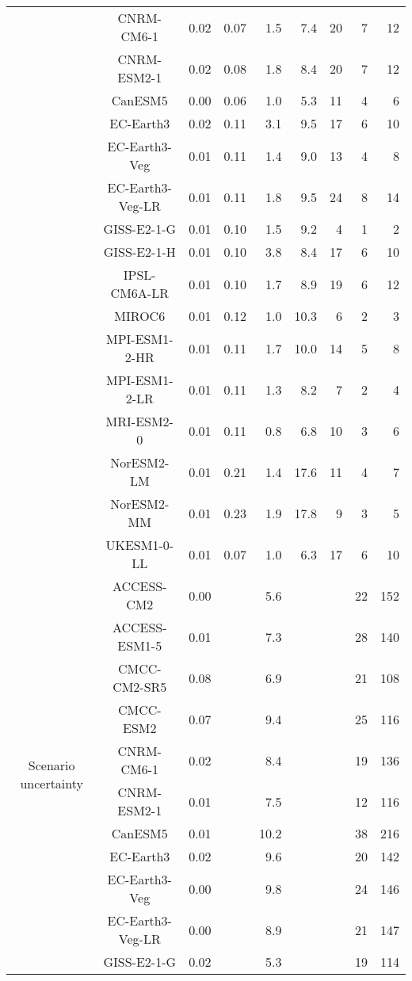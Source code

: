 \begin{table*}[t]
\begin{tabular}{c|c|rr|rr|rrr}
 & CNRM-CM6-1 & 0.02 & 0.07 & 1.5 & 7.4 & 20 & 7 & 12 \\
 & CNRM-ESM2-1 & 0.02 & 0.08 & 1.8 & 8.4 & 20 & 7 & 12 \\
 & CanESM5 & 0.00 & 0.06 & 1.0 & 5.3 & 11 & 4 & 6 \\
 & EC-Earth3 & 0.02 & 0.11 & 3.1 & 9.5 & 17 & 6 & 10 \\
 & EC-Earth3-Veg & 0.01 & 0.11 & 1.4 & 9.0 & 13 & 4 & 8 \\
 & EC-Earth3-Veg-LR & 0.01 & 0.11 & 1.8 & 9.5 & 24 & 8 & 14 \\
 & GISS-E2-1-G & 0.01 & 0.10 & 1.5 & 9.2 & 4 & 1 & 2 \\
 & GISS-E2-1-H & 0.01 & 0.10 & 3.8 & 8.4 & 17 & 6 & 10 \\
 & IPSL-CM6A-LR & 0.01 & 0.10 & 1.7 & 8.9 & 19 & 6 & 12 \\
 & MIROC6 & 0.01 & 0.12 & 1.0 & 10.3 & 6 & 2 & 3 \\
 & MPI-ESM1-2-HR & 0.01 & 0.11 & 1.7 & 10.0 & 14 & 5 & 8 \\
 & MPI-ESM1-2-LR & 0.01 & 0.11 & 1.3 & 8.2 & 7 & 2 & 4 \\
 & MRI-ESM2-0 & 0.01 & 0.11 & 0.8 & 6.8 & 10 & 3 & 6 \\
 & NorESM2-LM & 0.01 & 0.21 & 1.4 & 17.6 & 11 & 4 & 7 \\
 & NorESM2-MM & 0.01 & 0.23 & 1.9 & 17.8 & 9 & 3 & 5 \\
 & UKESM1-0-LL & 0.01 & 0.07 & 1.0 & 6.3 & 17 & 6 & 10 \\
\cline{1-9}
\multirow[c]{20}{*}{Scenario uncertainty} & ACCESS-CM2 & 0.00 &  & 5.6 &  &  & 22 & 152 \\
 & ACCESS-ESM1-5 & 0.01 &  & 7.3 &  &  & 28 & 140 \\
 & CMCC-CM2-SR5 & 0.08 &  & 6.9 &  &  & 21 & 108 \\
 & CMCC-ESM2 & 0.07 &  & 9.4 &  &  & 25 & 116 \\
 & CNRM-CM6-1 & 0.02 &  & 8.4 &  &  & 19 & 136 \\
 & CNRM-ESM2-1 & 0.01 &  & 7.5 &  &  & 12 & 116 \\
 & CanESM5 & 0.01 &  & 10.2 &  &  & 38 & 216 \\
 & EC-Earth3 & 0.02 &  & 9.6 &  &  & 20 & 142 \\
 & EC-Earth3-Veg & 0.00 &  & 9.8 &  &  & 24 & 146 \\
 & EC-Earth3-Veg-LR & 0.00 &  & 8.9 &  &  & 21 & 147 \\
 & GISS-E2-1-G & 0.02 &  & 5.3 &  &  & 19 & 114 \\

\end{tabular}
\end{table*}
